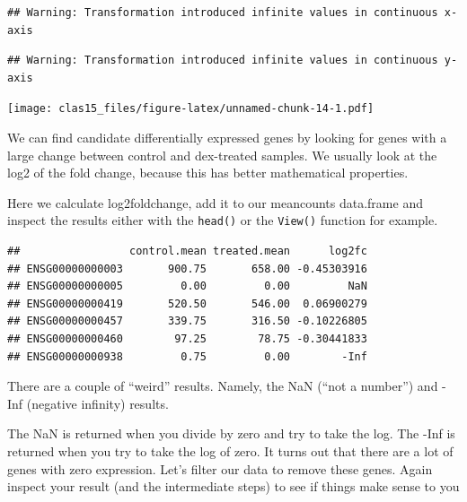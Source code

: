 \documentclass[
]{article}
\newenvironment{Shaded}{\begin{snugshade}}{\end{snugshade}}
\newcommand{\FunctionTok}[1]{\textcolor[rgb]{0.00,0.00,0.00}{#1}}
\newcommand{\NormalTok}[1]{#1}
\newcommand{\OtherTok}[1]{\textcolor[rgb]{0.56,0.35,0.01}{#1}}
\newcommand{\SpecialCharTok}[1]{\textcolor[rgb]{0.00,0.00,0.00}{#1}}
\newcommand{\StringTok}[1]{\textcolor[rgb]{0.31,0.60,0.02}{#1}}
\begin{document}
\begin{verbatim}
## Warning: Transformation introduced infinite values in continuous x-axis
\end{verbatim}

\begin{verbatim}
## Warning: Transformation introduced infinite values in continuous y-axis
\end{verbatim}

\texttt{[image: clas15\_files/figure-latex/unnamed-chunk-14-1.pdf]}

We can find candidate differentially expressed genes by looking for
genes with a large change between control and dex-treated samples. We
usually look at the log2 of the fold change, because this has better
mathematical properties.

Here we calculate log2foldchange, add it to our meancounts data.frame
and inspect the results either with the \texttt{head()} or the
\texttt{View()} function for example.

\begin{Shaded}
\end{Shaded}

\begin{verbatim}
##                 control.mean treated.mean      log2fc
## ENSG00000000003       900.75       658.00 -0.45303916
## ENSG00000000005         0.00         0.00         NaN
## ENSG00000000419       520.50       546.00  0.06900279
## ENSG00000000457       339.75       316.50 -0.10226805
## ENSG00000000460        97.25        78.75 -0.30441833
## ENSG00000000938         0.75         0.00        -Inf
\end{verbatim}

There are a couple of ``weird'' results. Namely, the NaN (``not a
number'') and -Inf (negative infinity) results.

The NaN is returned when you divide by zero and try to take the log. The
-Inf is returned when you try to take the log of zero. It turns out that
there are a lot of genes with zero expression. Let's filter our data to
remove these genes. Again inspect your result (and the intermediate
steps) to see if things make sense to you
\end{document}
